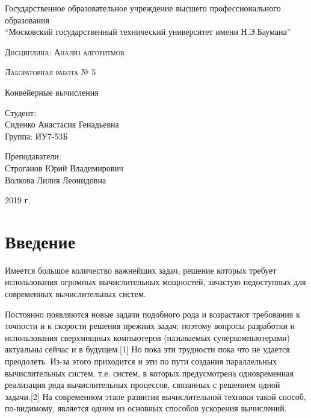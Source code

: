 \documentclass[a4paper,14pt]{article} %
\newcommand{\anonsection}[1]{\section*{#1}\addcontentsline{toc}{section}{#1}}
\begin{document}
	\begin{titlepage}

       		\begin{center}
         		\large
		
        			Государственное образовательное учреждение высшего профессионального образования\\
       			“Московский государственный технический университет имени Н.Э.Баумана”
         		\vspace{3cm}
            
            		\textsc{Дисциплина: Анализ алгоритмов}
           		\vspace{0.5cm}
                
            		\textsc{Лабораторная работа № 5}
           		 \vspace{3cm}
            
           		 \LARGE 
		 
		 	Конвейерные вычисления
           		 \vspace{3cm}
            
            		\begin{flushright}
            			Студент: \\
				Сиденко Анастасия Генадьевна \\   
            			Группа: ИУ7-53Б \\
           			\hfill
            
           			Преподаватели: \\
				Строганов Юрий Владимирович \\
           			Волкова Лилия Леонидовна
            			\vfill
            		\end{flushright}
		
			\large
            		2019 г.
		\end{center}

	\end{titlepage}
    
	\tableofcontents
	
	\newpage
    
	\anonsection{Введение}
	\hfill
	
	Имеется большое количество важнейших задач, решение которых требует использования огромных вычислительных мощностей, зачастую недоступных для современных вычислительных систем. 
	
	 Постоянно появляются новые задачи подобного рода и возрастают требования к точности и к скорости решения прежних задач; поэтому вопросы разработки и использования сверхмощных компьютеров (называемых суперкомпьютерами) актуальны сейчас и в будущем.[1] Но пока эти трудности пока что не удается преодолеть. Из-за этого приходится и эти по пути создания параллельных вычислительных систем, т.е. систем, в которых предусмотрена одновременная реализация ряда вычислительных процессов, связанных с решением одной задачи.[2] На современном этапе развития вычислительной техники такой способ, по-видимому, является одним из основных способов ускорения вычислений.
	 
\end{document}
